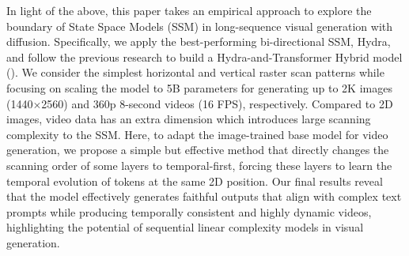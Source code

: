 In light of the above, this paper takes an empirical approach to explore the boundary of State Space Models (SSM) in long-sequence visual generation with diffusion. Specifically, we apply the best-performing bi-directional SSM, Hydra, and follow the previous research to build a Hydra-and-Transformer Hybrid model (\textbf{\ours{}}). We consider the simplest horizontal and vertical raster scan patterns while focusing on scaling the model to 5B parameters for generating up to 2K images (1440$\times$2560) and 360p 8-second videos (16 FPS), respectively. Compared to 2D images, video data has an extra dimension which introduces large scanning complexity to the SSM. Here, to adapt the image-trained \ours{} base model for video generation, we propose a simple but effective method that directly changes the scanning order of some layers to temporal-first, forcing these layers to learn the temporal evolution of tokens at the same 2D position. 
Our final results reveal that the \ours{} model effectively generates faithful outputs that align with complex text prompts while producing temporally consistent and highly dynamic videos, highlighting the potential of sequential linear complexity models in visual generation.
